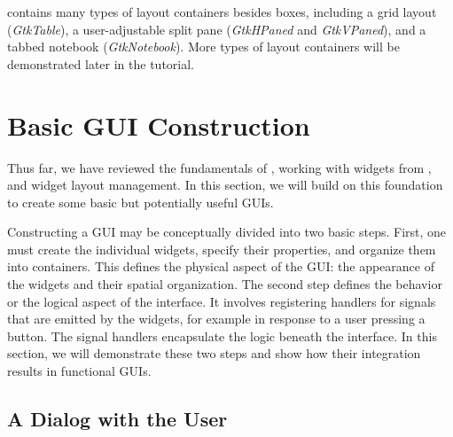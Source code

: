 \documentclass[article]{jss}
\begin{document}
 contains many types of layout containers besides boxes, including 
a grid layout (\emph{GtkTable}), a user-adjustable split pane (\emph{GtkHPaned}
and \emph{GtkVPaned}), and a tabbed notebook (\emph{GtkNotebook}). More types of
layout containers will be demonstrated later in the tutorial.

\section{Basic GUI Construction}


Thus far, we have reviewed the fundamentals of , working with
 widgets from , and widget layout management. In this
section, we will build on this foundation to create some basic but potentially
useful GUIs. 

Constructing a GUI may be conceptually divided into two basic steps.
First, one must create the individual widgets, specify their properties,
and organize them into containers. This defines the physical aspect
of the GUI: the appearance of the widgets and their spatial organization.
The second step defines the behavior or the logical aspect of the
interface. It involves registering handlers for signals that are emitted
by the widgets, for example in response to a user pressing a button.
The signal handlers encapsulate the logic beneath the interface. In this
section, we will demonstrate these two steps and show how their integration
results in functional GUIs.

\subsection{A Dialog with the User}\label{sec:dialog-example}
\end{document}
